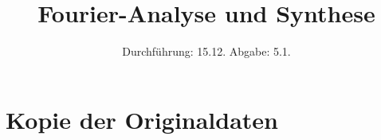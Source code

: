 

\subject{V 351}
\title{Fourier-Analyse und Synthese}
\date{
  Durchführung: 15.12.
  \hspace{3em}
  Abgabe: 5.1.
}



\maketitle
\thispagestyle{empty}
\tableofcontents
\newpage






\printbibliography

\appendix
\section{Kopie der Originaldaten}


